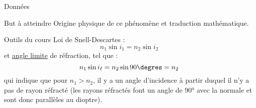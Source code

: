 \documentclass[../main/main.tex]{subfiles}
\begin{document}
\begin{tcbraster}[raster columns=7, raster equal height=rows]
\begin{NCdefi}[raster multicolumn=4]{Données}
\begin{center}
        \end{center}
    \end{NCdefi}
    \begin{tcolorbox}[blankest, raster multicolumn=3, space to=\myspace]
        \begin{tcbraster}[raster columns=1]
            \begin{NCprop}{But à atteindre}
                Origine physique de ce phénomène et traduction mathématique.
            \end{NCprop}    
            \begin{NCdemo}{Outils du cours}
                Loi de Snell-Descartes :
                \[ n_1\sin i_1 = n_2\sin i_2\]
                et \underline{angle limite} de réfraction, tel que :
                \[ n_1\sin i_\ell = n_2\sin 90\degres = n_2\]
                qui indique que pour $n_1 > n_2$, il y a un angle d'incidence à
                partir duquel il n'y a pas de rayon réfracté (les rayons
                réfractés font un angle de 90° avec la normale et sont donc
                parallèles au dioptre).
            \end{NCdemo}
        \end{tcbraster}
    \end{tcolorbox}
\end{tcbraster}
\end{document}
